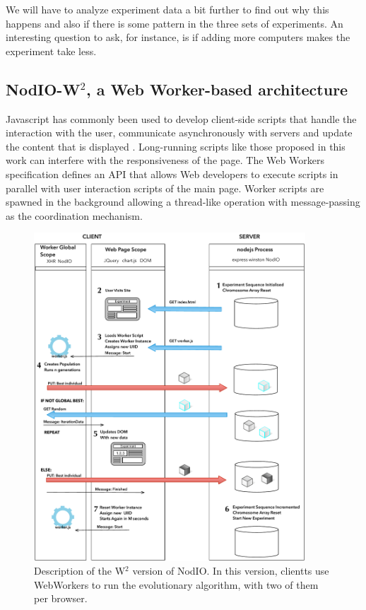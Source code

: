 \documentclass[journal,onecolumn]{IEEEtran}
\begin{document}
We will have to analyze experiment data a bit further to find out why
this happens and also if there is some pattern in the three sets of
experiments. An interesting question to ask, for instance, is if
adding more computers makes the experiment take less. 

\subsection{{\sf NodIO-W$^2$}, a Web Worker-based architecture}

Javascript has commonly been used to develop client-side scripts that handle the interaction 
with the user, communicate asynchronously with servers and update the content that is displayed \cite{flanagan2006javascript}.
Long-running scripts like those proposed in this work can interfere with the responsiveness of 
the page. The Web Workers specification \cite{hickson2012web} defines an API that allows Web developers 
to execute scripts in parallel with user interaction scripts of the main page. 
Worker scripts are spawned in the background allowing a thread-like operation with 
message-passing as the coordination mechanism. 



\begin{figure}[!t]
\centering
\includegraphics[width=4in]{img/Algorithm.pdf}
\caption{Description of the W$^2$ version of {\sf NodIO}. In this
  version, clientts use WebWorkers to run the evolutionary algorithm,
  with two of them per browser.}  
\label{fig:system:w2}
\end{figure}
\end{document}
